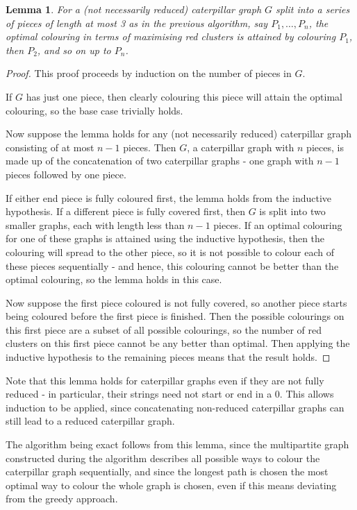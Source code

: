 \documentclass{mpaper}
\newtheorem{lemma}[theorem]{Lemma}
\begin{document}
\begin{lemma}
\label{lem/sequential-optimal}
For a (not necessarily reduced) caterpillar graph $G$ split into a series of pieces of length at most 3 as in the previous algorithm, say $P_1, \dots, P_n$, the optimal colouring in terms of maximising red clusters is attained by colouring $P_1$, then $P_2$, and so on up to $P_n$.
\end{lemma}
\begin{proof}
This proof proceeds by induction on the number of pieces in $G$.

 If $G$ has just one piece, then clearly colouring this piece will attain the optimal colouring, so the base case trivially holds.

 Now suppose the lemma holds for any (not necessarily reduced) caterpillar graph consisting of at most $n-1$ pieces. Then $G$, a caterpillar graph with $n$ pieces, is made up of the concatenation of two caterpillar graphs - one graph with $n-1$ pieces followed by one piece.

If either end piece is fully coloured first, the lemma holds from the inductive hypothesis. If a different piece is fully covered first, then $G$ is split into two smaller graphs, each with length less than $n-1$ pieces. If an optimal colouring for one of these graphs is attained using the inductive hypothesis, then the colouring will spread to the other piece, so it is not possible to colour each of these pieces sequentially - and hence, this colouring cannot be better than the optimal colouring, so the lemma holds in this case.

Now suppose the first piece coloured is not fully covered, so another piece starts being coloured before the first piece is finished. Then the possible colourings on this first piece are a subset of all possible colourings, so the number of red clusters on this first piece cannot be any better than optimal. Then applying the inductive hypothesis to the remaining pieces means that the result holds.

\end{proof}

Note that this lemma holds for caterpillar graphs even if they are not fully reduced - in particular, their strings need not start or end in a $0$. This allows induction to be applied, since concatenating non-reduced caterpillar graphs can still lead to a reduced caterpillar graph.

The algorithm being exact follows from this lemma, since the multipartite graph constructed during the algorithm describes all possible ways to colour the caterpillar graph sequentially, and since the longest path is chosen the most optimal way to colour the whole graph is chosen, even if this means deviating from the greedy approach.
\end{document}
